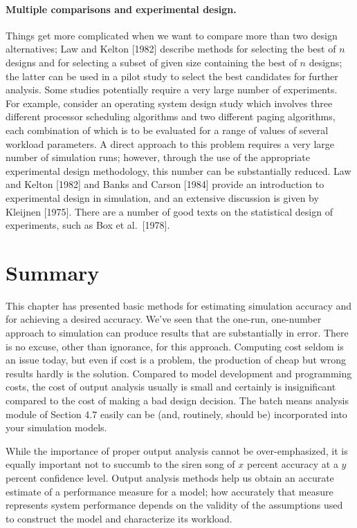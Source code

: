 \paragraph{Multiple comparisons and experimental design.}
Things get more complicated when we want to compare more than two design
alternatives; Law and Kelton [1982] describe methods for selecting the best of
$n$ designs and for selecting a subset of given size containing the best of $n$
designs; the latter can be used in a pilot study to select the best candidates
for further analysis. Some studies potentially require a very large number of
experiments. For example, consider an operating system design study which
involves three different processor scheduling algorithms and two different
paging algorithms, each combination of which is to be evaluated for a range of
values of several workload parameters. A direct approach to this problem
requires a very large number of simulation runs; however, through the use of
the appropriate experimental design methodology, this number can be
substantially reduced. Law and Kelton [1982] and Banks and Carson [1984]
provide an introduction to experimental design in simulation, and an extensive
discussion is given by Kleijnen [1975]. There are a number of good texts on the
statistical design of experiments, such as Box et al.\ [1978].

\section{Summary}
\label{sec:output-summary}

This chapter has presented basic methods for estimating simulation accuracy
and for achieving a desired accuracy. We've seen that the one-run, one-number
approach to simulation can produce results that are substantially in error.
There is no excuse, other than ignorance, for this approach. Computing cost
seldom is an issue today, but even if cost is a problem, the production of
cheap but wrong results hardly is the solution. Compared to model development
and programming costs, the cost of output analysis usually is small and
certainly is insignificant compared to the cost of making a bad design
decision. The batch means analysis module of Section 4.7 easily can be (and,
routinely, should be) incorporated into your simulation models.

While the importance of proper output analysis cannot be over-emphasized, it
is equally important not to succumb to the siren song of $x$ percent accuracy
at a $y$ percent confidence level. Output analysis methods help us obtain an
accurate estimate of a performance measure for a model; how accurately that
measure represents system performance depends on the validity of the
assumptions used to construct the model and characterize its workload.

